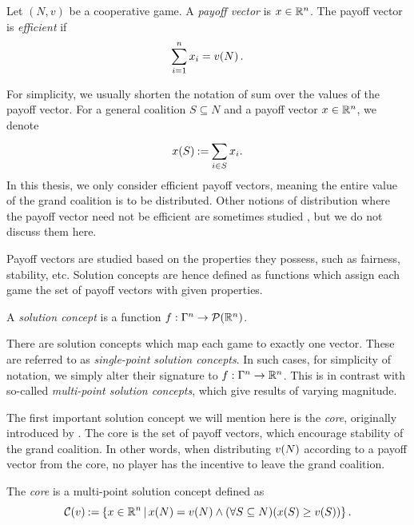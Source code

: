 \begin{defi}
	Let $ \left( N,v \right) $ be a cooperative game.
	A \emph{payoff vector} is $ x \in \mathbb{R}^n $.
	The payoff vector is \emph{efficient} if \[
		\sum_{i = 1}^{n} x_i = v\!\left(N\right).
	\]
\end{defi}

For simplicity, we usually shorten the notation of sum over the values of the payoff vector.
For a general coalition $ S \subseteq N $ and a payoff vector $ x \in \mathbb{R}^n $, we denote \[
	x\!\left(S\right) \mathbin{:=} \sum_{i \in S}^{} x_i.
\]
In this thesis, we only consider efficient payoff vectors, meaning the entire value of the grand coalition is to be distributed.
Other notions of distribution where the payoff vector need not be efficient are sometimes studied \citep{aumann74coop,bachrach2009cost}, but we do not discuss them here. 

Payoff vectors are studied based on the properties they possess, such as fairness, stability, etc.
Solution concepts are hence defined as functions which assign each game the set of payoff vectors with given properties.

\begin{defi}
	A \emph{solution concept} is a function $ f: \Gamma^{n} \to \mathcal{P}\!\left(\mathbb{R}^n\right) $.
\end{defi}

There are solution concepts which map each game to exactly one vector.
These are referred to as \emph{single-point solution concepts}.
In such cases, for simplicity of notation, we simply alter their signature to $ f: \Gamma^{n} \to \mathbb{R}^n $.
This is in contrast with so-called \emph{multi-point solution concepts}, which give results of varying magnitude.

The first important solution concept we will mention here is the \emph{core}, originally introduced by \cite{Gillies1959}.
The core is the set of payoff vectors, which encourage stability of the grand coalition.
In other words, when distributing $ v\!\left(N\right) $ according to a payoff vector from the core, no player has the incentive to leave the grand coalition.

\begin{defi}
	The \emph{core} is a multi-point solution concept defined as \[
		\mathcal{C}\!\left(v\right) \mathbin{:=} \left\{ x \in \mathbb{R}^n \,|\, x\!\left(N\right) =v\!\left(N\right) \land \left( \forall S \subseteq N \right)\! \left( x\!\left(S\right) \geq v\!\left(S\right) \right) \right\}.
	\]
\end{defi}

